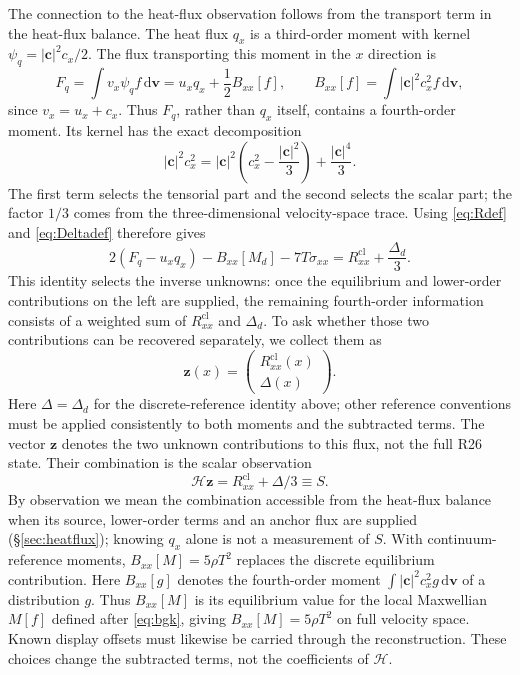 \documentclass[lineno,paper]{JFM-FLM_Au}
\newenvironment{revision}{\nolinenumbers\begin{tcolorbox}[breakable,colback=revisionyellow,colframe=revisionyellow,boxrule=0pt,arc=0pt,left=5pt,right=5pt,top=5pt,bottom=5pt,before skip=6pt,after skip=6pt]\captionsetup{width=\linewidth}}{\end{tcolorbox}\linenumbers}
\newenvironment{revision}{}{}
\newcommand{\dd}{\mathrm{d}}
\newcommand{\cl}{\mathrm{cl}}
\begin{document}
\begin{revision}
The connection to the heat-flux observation follows from the transport term in the heat-flux balance. The heat flux $q_x$ is a third-order moment with kernel $\psi_q=|\boldsymbol c|^2c_x/2$. The flux transporting this moment in the $x$ direction is
\[
 F_q=\int v_x\psi_q f\,\dd\boldsymbol v
     =u_xq_x+\frac12 B_{xx}[f],
 \qquad B_{xx}[f]=\int |\boldsymbol c|^2c_x^2f\,\dd\boldsymbol v,
\]
since $v_x=u_x+c_x$. Thus $F_q$, rather than $q_x$ itself, contains a fourth-order moment. Its kernel has the exact decomposition
\[
 |\boldsymbol c|^2c_x^2
 =|\boldsymbol c|^2\left(c_x^2-\frac{|\boldsymbol c|^2}{3}\right)
   +\frac{|\boldsymbol c|^4}{3} .
\]
The first term selects the tensorial part and the second selects the scalar part; the factor $1/3$ comes from the three-dimensional velocity-space trace. Using \eqref{eq:Rdef} and \eqref{eq:Deltadef} therefore gives
\[
 2(F_q-u_xq_x)-B_{xx}[M_d]-7T\sigma_{xx}
 =R^{\cl}_{xx}+\frac{\Delta_d}{3} .
\]
This identity selects the inverse unknowns: once the equilibrium and lower-order contributions on the left are supplied, the remaining fourth-order information consists of a weighted sum of $R^{\cl}_{xx}$ and $\Delta_d$. To ask whether those two contributions can be recovered separately, we collect them as
\begin{equation}
  \boldsymbol z(x)=\begin{pmatrix}R^{\cl}_{xx}(x)\\ \Delta(x)\end{pmatrix} .
  \label{eq:z_state}
\end{equation}
Here $\Delta=\Delta_d$ for the discrete-reference identity above; other reference conventions must be applied consistently to both moments and the subtracted terms. The vector $\boldsymbol z$ denotes the two unknown contributions to this flux, not the full R26 state. Their combination is the scalar observation
\begin{equation}
  \mathcal H\boldsymbol z = R^{\cl}_{xx}+\Delta/3 \equiv S .
  \label{eq:obs_operator}
\end{equation}
By observation we mean the combination accessible from the heat-flux balance when its source, lower-order terms and an anchor flux are supplied (\S\ref{sec:heatflux}); knowing $q_x$ alone is not a measurement of $S$. With continuum-reference moments, $B_{xx}[M]=5\rho T^2$ replaces the discrete equilibrium contribution. Here $B_{xx}[g]$ denotes the fourth-order moment
$\int |\boldsymbol c|^2c_x^2g\,\mathrm d\boldsymbol v$
of a distribution $g$. Thus $B_{xx}[M]$ is its equilibrium
value for the local Maxwellian $M[f]$ defined after
\eqref{eq:bgk}, giving $B_{xx}[M]=5\rho T^2$
on full velocity space. Known display offsets must likewise be carried through the reconstruction. These choices change the subtracted terms, not the coefficients of $\mathcal H$.
\end{revision}
\end{document}
